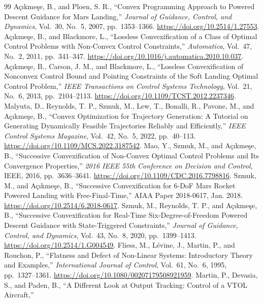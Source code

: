 \begin{thebibliography}{99}
 A\c{c}{\i}kme\c{s}e, B., and Ploen, S. R., ``Convex Programming Approach to Powered Descent Guidance for Mars
Landing,'' \emph{Journal of Guidance, Control, and Dynamics}, Vol.~30, No.~5, 2007, pp.~1353--1366. \url{https://doi.org/10.2514/1.27553}.
 A\c{c}{\i}kme\c{s}e, B., and Blackmore, L., ``Lossless Convexification of a Class of Optimal Control Problems
with Non-Convex Control Constraints,'' \emph{Automatica}, Vol.~47, No.~2, 2011, pp.~341--347. \url{https://doi.org/10.1016/j.automatica.2010.10.037}.
 A\c{c}{\i}kme\c{s}e, B., Carson, J. M., and Blackmore, L., ``Lossless Convexification of Nonconvex Control Bound
and Pointing Constraints of the Soft Landing Optimal Control Problem,'' \emph{IEEE Transactions on Control Systems Technology},
Vol.~21, No.~6, 2013, pp.~2104--2113. \url{https://doi.org/10.1109/TCST.2012.2237346}.
 Malyuta, D., Reynolds, T. P., Szmuk, M., Lew, T., Bonalli, R., Pavone, M., and A\c{c}{\i}kme\c{s}e, B., ``Convex
Optimization for Trajectory Generation: A Tutorial on Generating Dynamically Feasible Trajectories Reliably and Efficiently,''
\emph{IEEE Control Systems Magazine}, Vol.~42, No.~5, 2022, pp.~40--113. \url{https://doi.org/10.1109/MCS.2022.3187542}.
 Mao, Y., Szmuk, M., and A\c{c}{\i}kme\c{s}e, B., ``Successive Convexification of Non-Convex Optimal Control Problems
and Its Convergence Properties,'' \emph{2016 IEEE 55th Conference on Decision and Control}, IEEE, 2016, pp.~3636--3641.
\url{https://doi.org/10.1109/CDC.2016.7798816}.
 Szmuk, M., and A\c{c}{\i}kme\c{s}e, B., ``Successive Convexification for 6-DoF Mars Rocket Powered Landing with
Free-Final-Time,'' AIAA Paper 2018-0617, Jan. 2018. \url{https://doi.org/10.2514/6.2018-0617}.
 Szmuk, M., Reynolds, T. P., and A\c{c}{\i}kme\c{s}e, B., ``Successive Convexification for Real-Time
Six-Degree-of-Freedom Powered Descent Guidance with State-Triggered Constraints,'' \emph{Journal of Guidance, Control, and
Dynamics}, Vol.~43, No.~8, 2020, pp.~1399--1413. \url{https://doi.org/10.2514/1.G004549}.
 Fliess, M., L\'evine, J., Martin, P., and Rouchon, P., ``Flatness and Defect of Non-Linear Systems: Introductory
Theory and Examples,'' \emph{International Journal of Control}, Vol.~61, No.~6, 1995, pp.~1327--1361. \url{https://doi.org/10.1080/00207179508921959}.
 Martin, P., Devasia, S., and Paden, B., ``A Different Look at Output Tracking: Control of a VTOL Aircraft,''

\end{thebibliography}
